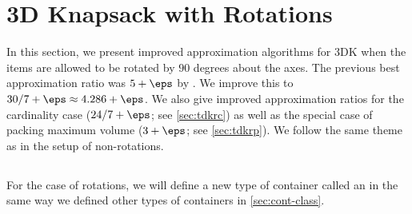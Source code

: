 

\section{3D Knapsack with Rotations}
\label{sec:tdkr}
In this section, we present improved approximation algorithms for 3DK when the items are allowed to be rotated by $90$ degrees about the axes.
The previous best approximation ratio was $5+\eps$ by \cite{3d-knapsack}. We improve this to $30/7+\eps\approx4.286+\eps$.
We also give improved approximation ratios for the cardinality case ($24/7+\eps$; see \cref{sec:tdkrc}) as well as the special case of packing maximum volume ($3+\eps$; see \cref{sec:tdkrp}).
We follow the same theme as in the setup of non-rotations.
\subsection{\texorpdfstring{\LContainers}{L-Containers}}
\label{sec:Lcontainer}
For the case of rotations, we will define a new type of container called an \emph{\LContainer} in the same way we defined other types of containers in \cref{sec:cont-class}. 

